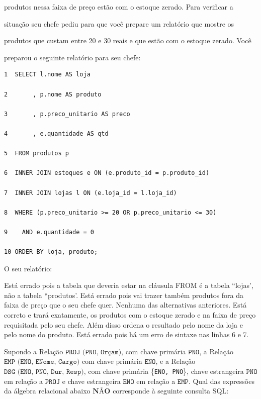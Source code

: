\documentclass[12pt, addpoints]{exam}
\begin{document}
\begin{questions}
produtos nessa faixa de preço estão com o estoque zerado. Para verificar a

situação seu chefe pediu para que você prepare um relatório que mostre os

produtos que custam entre 20 e 30 reais e que estão com o estoque zerado. Você

preparou o seguinte relatório para seu chefe:

\begin{tcolorbox}

 \begin{verbatim}1  SELECT l.nome AS loja

2       , p.nome AS produto

3       , p.preco_unitario AS preco

4       , e.quantidade AS qtd

5  FROM produtos p

6  INNER JOIN estoques e ON (e.produto_id = p.produto_id)

7  INNER JOIN lojas l ON (e.loja_id = l.loja_id)

8  WHERE (p.preco_unitario >= 20 OR p.preco_unitario <= 30)

9    AND e.quantidade = 0

10 ORDER BY loja, produto;

 \end{verbatim}

\end{tcolorbox}

O seu relatório:
\begin{choices}
\choice Está errado pois a tabela que deveria estar na cláusula FROM é a tabela ``lojas', não a tabela ``produtos'.
\choice Está errado pois vai trazer também produtos fora da faixa de preço que o seu chefe quer.
\choice Nenhuma das alternativas anteriores.
\choice Está correto e trará exatamente, os produtos com o estoque zerado e na faixa de preço requisitada pelo seu chefe. Além disso ordena o resultado pelo nome da loja e pelo nome do produto.
\choice Está errado pois há um erro de sintaxe nas linhas 6 e 7.
\end{choices}

\question

Supondo a Relação $\texttt{PROJ (PNO, Orçam)}$, com chave primária $\texttt{PNO}$, a Relação $\texttt{EMP (ENO, ENome, Cargo)}$ com chave primária $\texttt{ENO}$, e a Relação $\texttt{DSG (ENO, PNO, Dur, Resp)}$, com chave primária \{\texttt{ENO, PNO}\}, chave estrangeira $\texttt{PNO}$ em relação a $\texttt{PROJ}$ e chave estrangeira $\texttt{ENO}$ em relação a $\texttt{EMP}$. Qual das expressões da álgebra relacional abaixo $\textbf{NÃO}$ corresponde à seguinte consulta SQL:




\end{questions}
\end{document}
